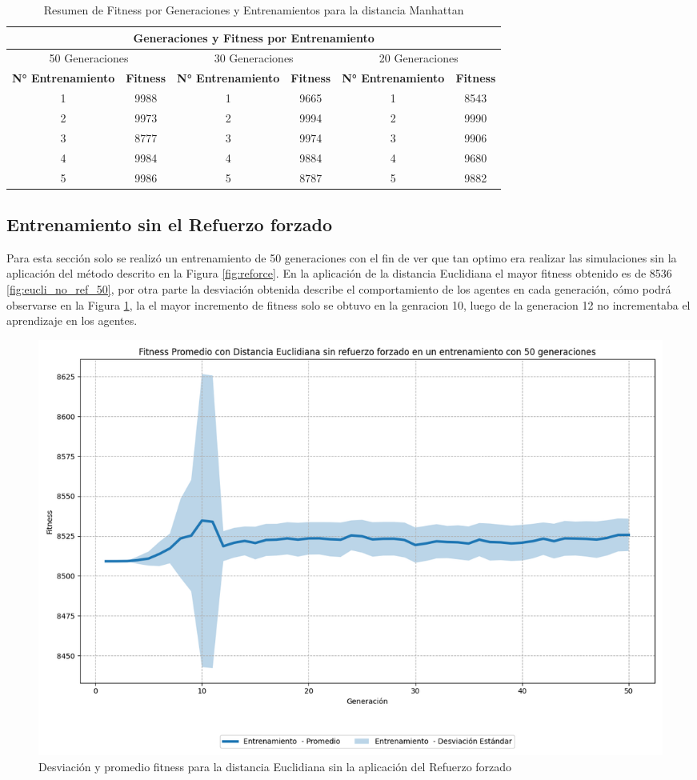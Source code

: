 \documentclass[conference]{IEEEtran}
\begin{document}
\begin{table}[ht]
    \centering
    \caption{Resumen de Fitness por Generaciones y Entrenamientos para la distancia Manhattan}
    \label{tab:fitness_generaciones_chebyshev}
    \begin{tabular}{cccccc}
        \toprule
        \multicolumn{6}{c}{Generaciones y Fitness por Entrenamiento} \\
        \midrule
        \multicolumn{2}{c}{50 Generaciones} & \multicolumn{2}{c}{30 Generaciones} & \multicolumn{2}{c}{20 Generaciones} \\
        \cmidrule(lr){1-2} \cmidrule(lr){3-4} \cmidrule(lr){5-6}
        \textbf{N° Entrenamiento} & \textbf{Fitness} & \textbf{N° Entrenamiento} & \textbf{Fitness} & \textbf{N° Entrenamiento} & \textbf{Fitness} \\
        \midrule
        1 & 9988 & 1 & 9665 & 1 & 8543 \\
        2 & 9973 & 2 & 9994 & 2 & 9990 \\
        3 & 8777 & 3 & 9974 & 3 & 9906 \\
        4 & 9984 & 4 & 9884 & 4 & 9680 \\
        5 & 9986 & 5 & 8787 & 5 & 9882 \\
        \bottomrule
    \end{tabular}
\end{table}

\subsection{Entrenamiento sin el Refuerzo forzado}
Para esta sección solo se realizó un entrenamiento de 50 generaciones con el fin de ver que tan optimo era realizar las simulaciones sin la aplicación del método descrito en la Figura \ref{fig:reforce}.
En la aplicación de la distancia Euclidiana el mayor fitness obtenido es de 8536 \ref{fig:eucli_no_ref_50}, por otra parte la desviación obtenida describe el comportamiento de los agentes en cada generación, cómo podrá observarse en la Figura \ref{fig:no_refoice_eucli_desv}, la el mayor incremento de fitness solo se obtuvo en la genracion 10, luego de la generacion 12 no incrementaba el aprendizaje en los agentes.
\begin{figure}[H]
    \centering
    \includegraphics[width=0.8\linewidth]{Sin_Refuerzo_50Gen/Eucli_NoRef_50Gen_Sombra.png}
    \caption{Desviación y promedio fitness para la distancia Euclidiana sin la aplicación del Refuerzo forzado}
    \label{fig:no_refoice_eucli_desv}
\end{figure}
\end{document}
